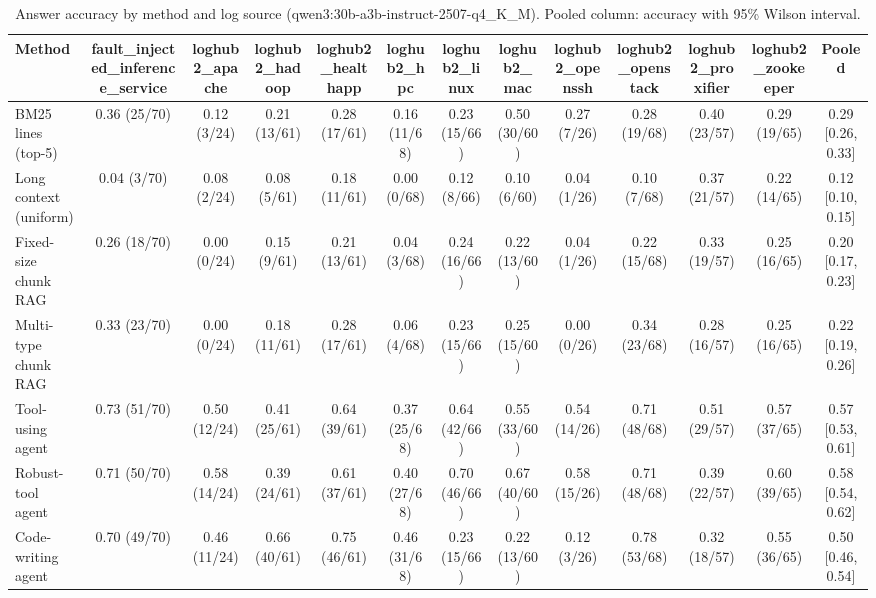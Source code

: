 \begin{table}[t]
\centering
\caption{Answer accuracy by method and log source (qwen3:30b-a3b-instruct-2507-q4_K_M). Pooled column: accuracy with 95\% Wilson interval.}
\label{tab:main_comparison__qwen3_30b_a3b_instruct}
\begin{tabular}{@{}lcccccccccccc@{}}
\toprule
Method & fault\_injected\_inference\_service & loghub2\_apache & loghub2\_hadoop & loghub2\_healthapp & loghub2\_hpc & loghub2\_linux & loghub2\_mac & loghub2\_openssh & loghub2\_openstack & loghub2\_proxifier & loghub2\_zookeeper & Pooled \\
\midrule
BM25 lines (top-5) & 0.36 (25/70) & 0.12 (3/24) & 0.21 (13/61) & 0.28 (17/61) & 0.16 (11/68) & 0.23 (15/66) & 0.50 (30/60) & 0.27 (7/26) & 0.28 (19/68) & 0.40 (23/57) & 0.29 (19/65) & 0.29 [0.26, 0.33] \\
Long context (uniform) & 0.04 (3/70) & 0.08 (2/24) & 0.08 (5/61) & 0.18 (11/61) & 0.00 (0/68) & 0.12 (8/66) & 0.10 (6/60) & 0.04 (1/26) & 0.10 (7/68) & 0.37 (21/57) & 0.22 (14/65) & 0.12 [0.10, 0.15] \\
Fixed-size chunk RAG & 0.26 (18/70) & 0.00 (0/24) & 0.15 (9/61) & 0.21 (13/61) & 0.04 (3/68) & 0.24 (16/66) & 0.22 (13/60) & 0.04 (1/26) & 0.22 (15/68) & 0.33 (19/57) & 0.25 (16/65) & 0.20 [0.17, 0.23] \\
Multi-type chunk RAG & 0.33 (23/70) & 0.00 (0/24) & 0.18 (11/61) & 0.28 (17/61) & 0.06 (4/68) & 0.23 (15/66) & 0.25 (15/60) & 0.00 (0/26) & 0.34 (23/68) & 0.28 (16/57) & 0.25 (16/65) & 0.22 [0.19, 0.26] \\
Tool-using agent & 0.73 (51/70) & 0.50 (12/24) & 0.41 (25/61) & 0.64 (39/61) & 0.37 (25/68) & 0.64 (42/66) & 0.55 (33/60) & 0.54 (14/26) & 0.71 (48/68) & 0.51 (29/57) & 0.57 (37/65) & 0.57 [0.53, 0.61] \\
Robust-tool agent & 0.71 (50/70) & 0.58 (14/24) & 0.39 (24/61) & 0.61 (37/61) & 0.40 (27/68) & 0.70 (46/66) & 0.67 (40/60) & 0.58 (15/26) & 0.71 (48/68) & 0.39 (22/57) & 0.60 (39/65) & 0.58 [0.54, 0.62] \\
Code-writing agent & 0.70 (49/70) & 0.46 (11/24) & 0.66 (40/61) & 0.75 (46/61) & 0.46 (31/68) & 0.23 (15/66) & 0.22 (13/60) & 0.12 (3/26) & 0.78 (53/68) & 0.32 (18/57) & 0.55 (36/65) & 0.50 [0.46, 0.54] \\
\bottomrule
\end{tabular}
\end{table}

